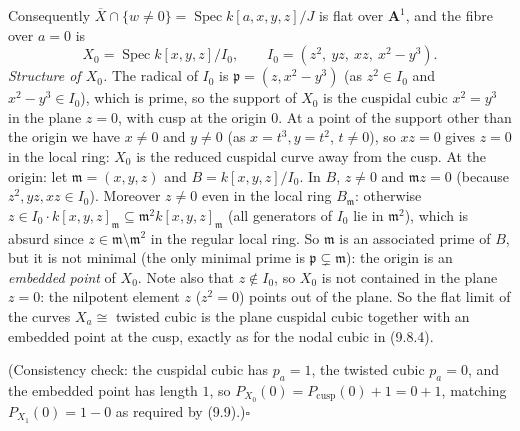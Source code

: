 \documentclass[11pt]{article}
\begin{document}
Consequently $\overline X\cap\{w\ne0\}=\operatorname{Spec}k[a,x,y,z]/J$ is flat over $\mathbf A^1$, and the fibre over $a=0$ is
\[
X_0=\operatorname{Spec}k[x,y,z]/I_0,\qquad I_0=(z^2,\ yz,\ xz,\ x^2-y^3).
\]
\emph{Structure of $X_0$.} The radical of $I_0$ is $\mathfrak p=(z,x^2-y^3)$ (as $z^2\in I_0$ and $x^2-y^3\in I_0$), which is prime, so the support of $X_0$ is the cuspidal cubic $x^2=y^3$ in the plane $z=0$, with cusp at the origin $0$. At a point of the support other than the origin we have $x\ne0$ and $y\ne0$ (as $x=t^3,y=t^2$, $t\ne0$), so $xz=0$ gives $z=0$ in the local ring: $X_0$ is the reduced cuspidal curve away from the cusp. At the origin: let $\mathfrak m=(x,y,z)$ and $B=k[x,y,z]/I_0$. In $B$, $z\ne0$ and $\mathfrak m z=0$ (because $z^2,yz,xz\in I_0$). Moreover $z\ne0$ even in the local ring $B_{\mathfrak m}$: otherwise $z\in I_0\cdot k[x,y,z]_{\mathfrak m}\subseteq\mathfrak m^2k[x,y,z]_{\mathfrak m}$ (all generators of $I_0$ lie in $\mathfrak m^2$), which is absurd since $z\in\mathfrak m\setminus\mathfrak m^2$ in the regular local ring. So $\mathfrak m$ is an associated prime of $B$, but it is not minimal (the only minimal prime is $\mathfrak p\subsetneq\mathfrak m$): the origin is an \emph{embedded point} of $X_0$. Note also that $z\notin I_0$, so $X_0$ is not contained in the plane $z=0$: the nilpotent element $z$ ($z^2=0$) points out of the plane. So the flat limit of the curves $X_a\cong$ twisted cubic is the plane cuspidal cubic together with an embedded point at the cusp, exactly as for the nodal cubic in (9.8.4).

(Consistency check: the cuspidal cubic has $p_a=1$, the twisted cubic $p_a=0$, and the embedded point has length $1$, so $P_{X_0}(0)=P_{\text{cusp}}(0)+1=0+1$, matching $P_{X_1}(0)=1-0$ as required by (9.9).)\hfill$\square$
\end{document}
